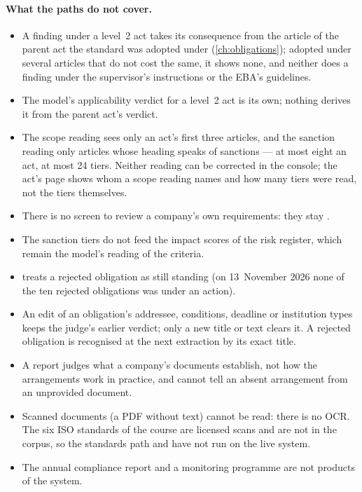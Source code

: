 \paragraph{What the paths do not cover.}
\begin{itemize}
  \item A finding under a level~2 act takes its consequence from the article of the parent
    act the standard was adopted under (\cref{ch:obligations}); adopted under several
    articles that do not cost the same, it shows none, and neither does a finding under the
    supervisor's instructions or the EBA's guidelines.
  \item The model's applicability verdict for a level~2 act is its own; nothing derives it
    from the parent act's verdict.
  \item The scope reading sees only an act's first three articles, and the sanction reading
    only articles whose heading speaks of sanctions --- at most eight an act, at most 24
    tiers. Neither reading can be corrected in the console; the act's page shows whom a
    scope reading names and how many tiers were read, not the tiers themselves.
  \item There is no screen to review a company's own requirements: they stay
    .
  \item The sanction tiers do not feed the impact scores of the risk register, which remain
    the model's reading of the criteria.
  \item {} treats a rejected obligation as still standing (on
    13~November 2026 none of the ten rejected obligations was under an action).
  \item An edit of an obligation's addressee, conditions, deadline or institution types keeps
    the judge's earlier verdict; only a new title or text clears it. A rejected obligation is
    recognised at the next extraction by its exact title.
  \item A report judges what a company's documents establish, not how the arrangements work in
    practice, and cannot tell an absent arrangement from an unprovided document.
  \item Scanned documents (a PDF without text) cannot be read: there is no OCR. The six ISO
    standards of the course are licensed scans and are not in the corpus, so the standards
    path and  have not run on the live system.
  \item The annual compliance report and a monitoring programme are not products of the
    system.
\end{itemize}

